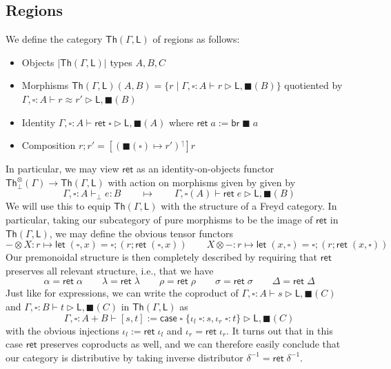 \documentclass[acmsmall,screen,review]{acmart}
\newcommand{\ms}[1]{\ensuremath{\mathsf{#1}}}
\newcommand{\lto}{:}
\newcommand{\linl}[1]{\iota_l\;{#1}}
\newcommand{\linr}[1]{\iota_r\;{#1}}
\newcommand{\brb}[2]{\ms{br}\;#1\;#2}
\newcommand{\casestmt}[5]{\ms{case}\;#1\;\{\linl{#2} \lto #3, \linr{#4} \lto #5\}}
\newcommand{\lupg}[1]{{#1}^\upharpoonleft}
\newcommand{\bhyp}[2]{#1 : #2}
\newcommand{\hasty}[4]{#1 \vdash_{#2} #3: {#4}}
\newcommand{\haslb}[3]{#1 \vdash #2 \rhd #3}
\newcommand{\teqv}{\approx}
\newcommand{\lbeq}[4]{#1 \vdash #2 \teqv #3 \rhd {#4}}
\newcommand{\invar}{\square}
\newcommand{\outlb}{\blacksquare}
\begin{document}
\subsection{Regions}

We define the category $\ms{Th}(\Gamma, \ms{L})$ of regions as follows:
\begin{itemize}
  \item Objects $|\ms{Th}(\Gamma, \ms{L})|$ types $A, B, C$
  \item Morphisms $\ms{Th}(\Gamma, \ms{L})(A, B) = 
    \{r \mid \haslb{\Gamma, \bhyp{\invar}{A}}{r}{\ms{L}, \outlb(B)}\}$ 
    quotiented by $\lbeq{\Gamma, \bhyp{\invar}{A}}{r}{r'}{\ms{L}, \outlb(B)}$
  \item Identity $\haslb{\Gamma, \bhyp{\invar}{A}}{\ms{ret}\;\invar}{\ms{L}, \outlb(A)}$ where
    $\ms{ret}\;a := \brb{\outlb}{a}$
  \item Composition $r;r' = [\lupg{(\outlb(\invar) \mapsto r')}]r$
\end{itemize}
In particular, we may view $\ms{ret}$ as an identity-on-objects functor
$\ms{Th}^\otimes_\bot(\Gamma) \to \ms{Th}(\Gamma, \ms{L})$ with action on morphisms given by given
by 
\begin{equation}
  \hasty{\Gamma, \invar : A}{\bot}{e}{B} 
  \qquad \mapsto \qquad 
  \haslb{\Gamma, \invar(A)}{\ms{ret}\;e}{\ms{L}, \outlb(B)}
\end{equation}
We will use this to equip $\ms{Th}(\Gamma, \ms{L})$ with the structure of a Freyd category.
In particular, taking our subcategory of pure morphisms to be the image of $\ms{ret}$ in 
$\ms{Th}(\Gamma, \ms{L})$, we may define the obvious tensor functors
\begin{equation}
  - \otimes X : r \mapsto \ms{let}\;(\invar, x) = \invar; (r ; \ms{ret}\;(\invar, x)) \qquad
  X \otimes - : r \mapsto \ms{let}\;(x, \invar) = \invar; (r ; \ms{ret}\;(x, \invar))
\end{equation}
Our premonoidal structure is then completely described by requiring that $\ms{ret}$ preserves all
relevant structure, i.e., that we have
\begin{equation}
  \alpha = \ms{ret}\;\alpha \qquad
  \lambda = \ms{ret}\;\lambda \qquad
  \rho = \ms{ret}\;\rho \qquad
  \sigma = \ms{ret}\;\sigma \qquad
  \Delta = \ms{ret}\;\Delta
\end{equation}
Just like for expressions, we can write the coproduct of 
$\haslb{\Gamma, \bhyp{\invar}{A}}{s}{\ms{L}, \outlb(C)}$ and
$\haslb{\Gamma, \bhyp{\invar}{B}}{t}{\ms{L}, \outlb(C)}$
in $\ms{Th}(\Gamma, \ms{L})$ as
\begin{equation}
  \haslb{\Gamma, \invar : A + B}{[s, t] 
    := \casestmt{\invar}{\invar}{s}{\invar}{t}}{\ms{L}, \outlb(C)}
\end{equation}
with the obvious injections $\iota_l := \ms{ret}\;\iota_l$ and $\iota_r = \ms{ret}\;\iota_r$. It
turns out that in this case $\ms{ret}$ preserves coproducts as well, and we can therefore easily
conclude that our category is distributive by taking inverse distributor $\delta^{-1} =
\ms{ret}\;\delta^{-1}$.
\end{document}
